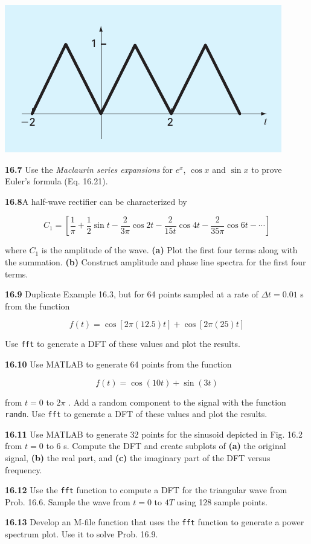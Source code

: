 \documentclass[../main.tex]{subfiles}
\begin{document}
\begin{multicols}{2}
	\noindent
    \begin{minipage}{\linewidth}
        \centering
        \includegraphics[width=0.8\linewidth]{./images/problem_16_6}
    \end{minipage}

	\noindent\textbf{16.7} Use the \textit{Maclaurin series expansions} for $e^x$, $\cos x$ and
	$\sin x$ to prove Euler's formula (Eq. 16.21).

	\noindent\textbf{16.8}A half-wave rectifier can be characterized by

	$$
		C_1 = [\frac{1}{\pi} + \frac{1}{2} \sin t 	- \frac{2}{3 \pi} \cos 2t - \frac{2}{15t} \cos 4t - \frac{2}{35 \pi} \cos 6t - \cdots]
	$$

	\noindent where $C_1$ is the amplitude of the wave.
	\textbf{(a)} Plot the first four terms along with the summation.
	\textbf{(b)} Construct amplitude and phase line spectra for the first
	four terms.

	\noindent\textbf{16.9} Duplicate Example 16.3, but for 64 points sampled at a
	rate of $\Delta t = 0.01$ s from the function

	$$
		f (t) = \cos[2 \pi (12.5)t] + \cos[2 \pi (25)t]
	$$

	\noindent Use \texttt{fft} to generate a DFT of these values and plot the
	results.

	\noindent\textbf{16.10}  Use MATLAB to generate 64 points from the function

	$$
	f (t) = \cos(10t) + \sin(3t)
	$$

	\noindent from $t = 0$ to $2 \pi$ . Add a random component to the signal with
	the function \texttt{randn}. Use \texttt{fft} to generate a DFT of these
	values and plot the results.

	\noindent\textbf{16.11}  Use MATLAB to generate 32 points for the sinusoid
	depicted in Fig. 16.2 from $t = 0$ to 6 s. Compute the DFT
	and create subplots of \textbf{(a)} the original signal, \textbf{(b)} the real
	part, and \textbf{(c)} the imaginary part of the DFT versus frequency.

	\noindent\textbf{16.12} Use the \texttt{fft} function to compute a DFT for the triangular wave from Prob. 16.6. Sample the wave from $t = 0$
	to $4T$ using 128 sample points.

	\noindent\textbf{16.13}  Develop an M-file function that uses the \texttt{fft} function to generate a power spectrum plot. Use it to solve
	Prob. 16.9.
\end{multicols}
\end{document}
